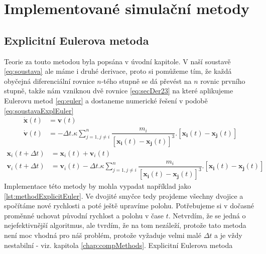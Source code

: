 \chapter{Implementované simulační metody}
\section{Explicitní Eulerova metoda}
\label{sec:explEuler}
Teorie za touto metodou byla popsána v úvodní kapitole. V naší soustavě 
\eqref{eq:soustava} ale máme i druhé derivace, proto si pomůžeme tím, že každá obyčejná diferenciální rovnice $ n $-tého stupně se dá převést na $ n $ rovnic prvního stupně, takže nám vzniknou dvě rovnice \eqref{eq:secDer23} na které aplikujeme Eulerovu metod \eqref{eq:euler} a dostaneme numerické řešení v podobě \eqref{eq:soustavaExplEuler}
\begin{subequations}
	\label{eq:secDer23}
	\begin{align}
	\label{eq:secDer2}
	\boldsymbol{\dot x}(t)&= \boldsymbol{v}(t) \\
	\label{eq:secDer3}
	\boldsymbol{\dot v}(t)&=- \Delta t . \kappa \sum_{j=1,j \neq i}^{n}\dfrac{m_i}
	{\left[ \boldsymbol{x_i}(t) - \boldsymbol{x_j}(t)\right] ^3} . 
	\left[ \boldsymbol{x_i}(t) - \boldsymbol{x_j}(t)\right] 
	\end{align}
\end{subequations}
\begin{subequations}\label{eq:soustavaExplEuler}
	\begin{align}
	\boldsymbol {x}_i(t+\Delta t)& =\boldsymbol{{x}}_i(t)  +\boldsymbol {v}_i(t)\\
	\boldsymbol {v}_i(t+\Delta t) &=\boldsymbol{{v}}_i(t)  - \Delta t . \kappa \sum_{j=1,j \neq i}^{n}\dfrac{m_i}
	{\left[ \boldsymbol{x_i}(t) - \boldsymbol{x_j}(t)\right] ^3} . 
	\left[ \boldsymbol{x_i}(t) - \boldsymbol{x_j}(t)\right] 
	\end{align}
\end{subequations}
Implementace této metody by mohla vypadat například jako \ref{lst:methodExplicitEuler}. Ve dvojité smyčce tedy projdeme všechny dvojice a spočítáme nové rychlosti a poté ještě upravíme polohu. Potřebujeme si v dočasné proměnné uchovat původní rychlost a polohu v čase $ t $. Netvrdím, že se jedná o nejefektivnější algoritmus, ale tvrdím, že na tom nezáleží, protože tato metoda není moc vhodná pro náš problém, protože vyžaduje velmi malé $ \Delta t $ a je vždy nestabilní - viz. kapitola \ref{chap:compMethods}.
{Explicitní Eulerova metoda}

